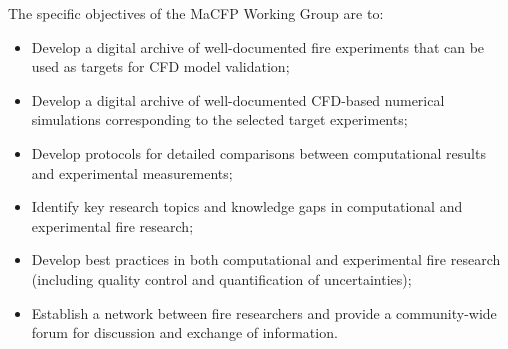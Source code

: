 \documentclass[12pt]{article}
\begin{document}
The specific objectives of the MaCFP Working Group are to:
\begin{itemize}[noitemsep]
 \item Develop a digital archive of well-documented fire experiments that can be used as targets for CFD model validation;
 \item Develop a digital archive of well-documented CFD-based numerical simulations corresponding to the selected target experiments;
 \item Develop protocols for detailed comparisons between computational results and experimental measurements;
 \item Identify key research topics and knowledge gaps in computational and experimental fire research;
 \item Develop best practices in both computational and experimental fire research (including quality control and quantification of uncertainties);
 \item Establish a network between fire researchers and provide a community-wide forum for discussion and exchange of information.
\end{itemize}
\end{document}

